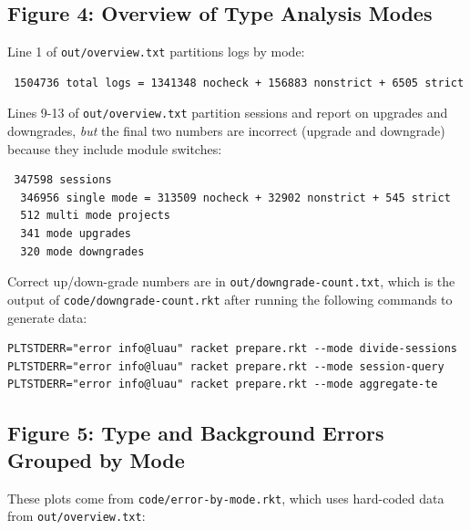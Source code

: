 \documentclass{article}
\begin{document}
\subsection*{Figure 4: Overview of Type Analysis Modes}

Line 1 of \texttt{out/overview.txt} partitions logs by mode:

\begin{verbatim}
 1504736 total logs = 1341348 nocheck + 156883 nonstrict + 6505 strict
\end{verbatim}

Lines 9-13 of \texttt{out/overview.txt} partition sessions and report on upgrades and downgrades,
\emph{but} the final two numbers are incorrect (upgrade and downgrade) because they include
module switches:

\begin{verbatim}
 347598 sessions
  346956 single mode = 313509 nocheck + 32902 nonstrict + 545 strict
  512 multi mode projects
  341 mode upgrades
  320 mode downgrades
\end{verbatim}

Correct up/down-grade numbers are in \texttt{out/downgrade-count.txt},
which is the output of \texttt{code/downgrade-count.rkt} after running
the following commands to generate data:

\begin{verbatim}
PLTSTDERR="error info@luau" racket prepare.rkt --mode divide-sessions
PLTSTDERR="error info@luau" racket prepare.rkt --mode session-query
PLTSTDERR="error info@luau" racket prepare.rkt --mode aggregate-te
\end{verbatim}




\subsection*{Figure 5: Type and Background Errors Grouped by Mode}

These plots come from \texttt{code/error-by-mode.rkt}, which uses
hard-coded data from \texttt{out/overview.txt}:
\end{document}
